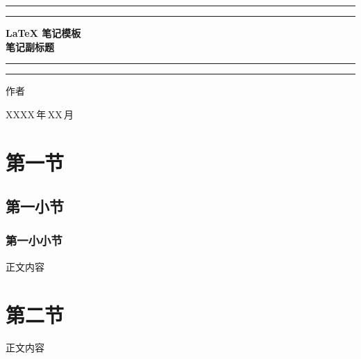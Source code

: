 \documentclass[cn,normal,11pt,blue]{elegantnote}
\numberwithin{equation}{section}
\numberwithin{figure}{section}
\numberwithin{table}{section}
\begin{document}


\begin{titlepage}
    \centering   %
    \vspace*{5\baselineskip}   %
    \color{ecolor}

    \rule{\textwidth}{1.6pt}\vspace*{-\baselineskip}\vspace*{2pt}  %
    \rule{\textwidth}{0.4pt}   %
	
    \vspace{0.75\baselineskip} %

    {%
    \bfseries \LaTeX{} 笔记模板   \\[20pt]
    \bfseries 笔记副标题
    }

	\vspace{0.75\baselineskip} %
	
	\rule{\textwidth}{0.4pt}\vspace*{-\baselineskip}\vspace{3.2pt} %
	\rule{\textwidth}{1.6pt}  %
	
	\vspace{4\baselineskip}   %

    {\fangsong\Large 作者 \\[10pt] }
	
    {\fangsong\Large XXXX\,年\,XX\,月 \\}
	\vfill
\end{titlepage}




\clearpage
{}
\tableofcontents
\clearpage
{}





\section{第一节}

\subsection{第一小节}

\subsubsection{第一小小节}
正文内容

\section{第二节}

正文内容
\end{document}
